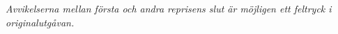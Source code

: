 \vspace{2mm}
\textit{
Avvikelserna mellan första och andra reprisens slut är möjligen ett feltryck i originalutgåvan.
}